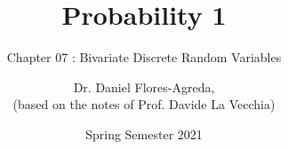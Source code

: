 \documentclass[notes=show,handout]{beamer}\usepackage[]{graphicx}\usepackage[]{color}
\newenvironment{stepitemize}{\begin{itemize}[<+->]}{\end{itemize} }
\renewcommand{\Pr}{P}
\begin{document}
\title[S110015]{Probability 1}
\subtitle{Chapter 07 : Bivariate Discrete Random Variables}
\author[Flores-Agreda, La Vecchia]{Dr. Daniel Flores-Agreda, \\[0.5em] \tiny{(based on the notes of Prof. Davide La Vecchia)}}
\date{Spring Semester 2021}

\begin{frame}
\titlepage
\end{frame}

%
%
%
%
%
%
%
%
\end{document}
